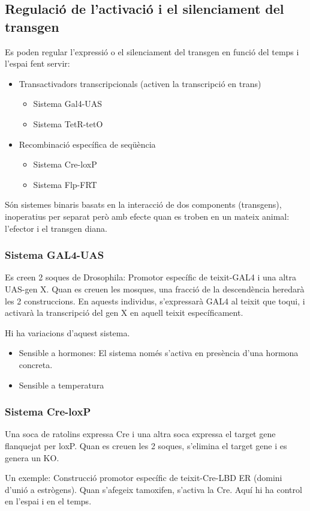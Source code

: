 

\subsection{Regulació de l'activació i el silenciament del transgen}
\label{sec:regul-de-lact}

Es poden regular l'expressió o el silenciament del transgen en funció
del temps i l'espai fent servir:
\begin{itemize}
\item Transactivadors transcripcionals (activen la transcripció en
  trans)
  \begin{itemize}
  \item Sistema Gal4-UAS
  \item Sistema TetR-tetO
  \end{itemize}
\item Recombinació específica de seqüència
  \begin{itemize}
  \item Sistema Cre-loxP
  \item Sistema Flp-FRT
  \end{itemize}
\end{itemize}

Són sistemes binaris basats en la interacció de dos components
(transgens), inoperatius per separat però amb efecte quan es troben en
un mateix animal: l'efector i el transgen diana.

\subsubsection{Sistema GAL4-UAS}
\label{sec:sistema-gal4-uas}
Es creen 2 soques de Drosophila: Promotor específic de teixit-GAL4 i
una altra UAS-gen X. Quan es creuen les mosques, una fracció de la
descendència heredarà les 2 construccions. En aquests individus,
s'expressarà GAL4 al teixit que toqui, i activarà la transcripció del
gen X en aquell teixit específicament.

Hi ha variacions d'aquest sistema. 
\begin{itemize}
\item Sensible a hormones: El sistema només s'activa en presència
  d'una hormona concreta.
\item Sensible a temperatura
\end{itemize}

\subsubsection{Sistema Cre-loxP}
\label{sec:sistema-cre-loxp}


Una soca de ratolins expressa Cre i una altra soca expressa el target
gene flanquejat per loxP. Quan es creuen les 2 soques, s'elimina el
target gene i es genera un KO.

Un exemple: Construcció promotor específic de teixit-Cre-LBD ER
(domini d'unió a estrògens). Quan s'afegeix tamoxifen, s'activa la
Cre. Aquí hi ha control en l'espai i en el temps.